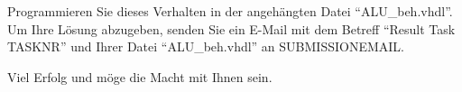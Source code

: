 \documentclass[a4paper,12pt]{article}
\begin{document}
Programmieren Sie dieses Verhalten in der angeh\"angten Datei "`ALU\_beh.vhdl"'.\\

Um Ihre L\"osung abzugeben, senden Sie ein E-Mail mit dem Betreff "`Result Task {{TASKNR}}"' und Ihrer Datei "`ALU\_beh.vhdl"'  an {{SUBMISSIONEMAIL}}.

\vspace{0.7cm}

Viel Erfolg und m\"oge die Macht mit Ihnen sein.
\end{document}
